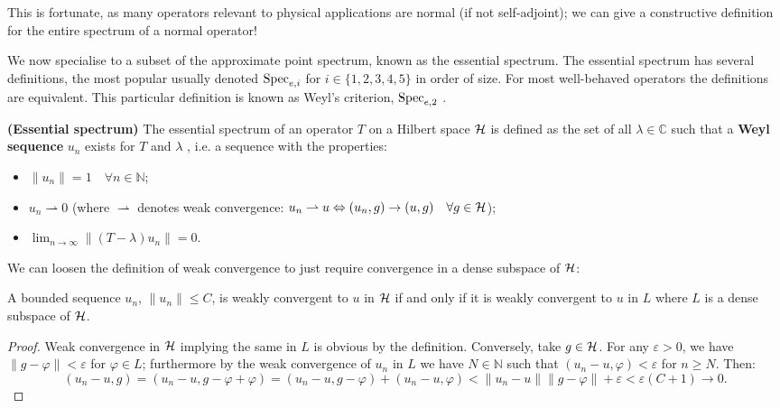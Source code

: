 \documentclass[../main.tex]{subfiles}
\begin{document}
This is fortunate, as many operators relevant to physical applications are
normal (if not self-adjoint); we can give a constructive definition for the
entire spectrum of a normal operator! 

We now specialise to a subset of the approximate point spectrum, known as the
essential spectrum. The essential spectrum has several definitions, 
the most popular usually denoted $\mathrm{Spec}_{e,i}$ for $i \in \{1,2,3,4,5\}$ in order of size. For 
most well-behaved operators the definitions are equivalent. This particular definition 
is known as Weyl's criterion, $\mathrm{Spec}_{e, 2}$ \cite{edmunds2018spectral}.

\begin{definition}{\textbf{(Essential spectrum)}}
  The essential spectrum of an operator $T$ on a Hilbert space $\mathcal{H}$ is
  defined as the set of all $\lambda \in \mathbb{C}$ such that a
  \textbf{Weyl sequence} $u_n$ exists for $T$ and
  $\lambda$ , i.e. a sequence with the properties:
  \begin{itemize}
    \item $\|u_n\| = 1\quad \forall n \in \mathbb{N}$;
    \item $u_n \rightharpoonup 0$ (where $\rightharpoonup$ denotes weak convergence:
	  $u_n \rightharpoonup u \Leftrightarrow (u_n, g) \rightarrow (u, g) \quad \forall g \in \mathcal{H}$);
    \item $\lim_{n \rightarrow \infty}\|(T - \lambda)u_n\|  = 0$.
  \end{itemize}
\end{definition}

We can loosen the definition of weak convergence to just require convergence in
a dense subspace of $\mathcal{H}$:
\begin{lemma}
\label{thm:weak-conv-dense-subset}
  A bounded sequence $u_n$, $\|u_n\| \leq C$, is weakly convergent to $u$ in
  $\mathcal{H}$ if and only if it is weakly convergent to $u$ in $L$ where $L$ is a
  dense subspace of $\mathcal{H}$. \end{lemma}
\begin{proof}
Weak convergence in $\mathcal{H}$ implying the same in $L$ is obvious by the
definition.
Conversely, take $g \in \mathcal{H}$. For any $\varepsilon > 0$, we have 
$\|g - \varphi\| < \varepsilon$ for $\varphi \in L$;
furthermore by the weak convergence of $u_n$ in $L$ we have $N \in
\mathbb{N}$ such that $(u_n - u, \varphi) < \varepsilon$ for $n \geq N$.
Then:
$$( u_n - u, g ) = ( u_n - u, g - \varphi + \varphi ) 
		 = ( u_n - u, g - \varphi ) + ( u_n - u, \varphi ) 
		 < \|u_n - u\| \|g - \varphi\| + \varepsilon < \varepsilon(C + 1) 
		 \rightarrow 0.$$
\end{proof}
\end{document}

